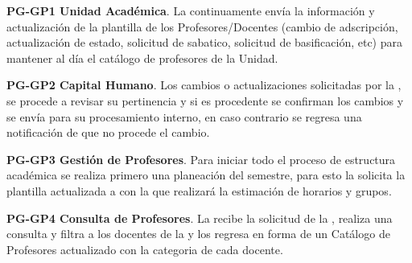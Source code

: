 
\begin{ADescripcion}
	\item \textbf{PG-GP1 Unidad Académica}. La  continuamente envía la información y actualización de la plantilla de los Profesores/Docentes (cambio de adscripción, actualización de estado, solicitud de sabatico, solicitud de basificación, etc) para mantener al día el catálogo de profesores de la Unidad.
	
	\item \textbf{PG-GP2 Capital Humano}. Los cambios o actualizaciones solicitadas por la , se procede a revisar su pertinencia y si es procedente se confirman los cambios y se envía para su procesamiento interno, en caso contrario se regresa una notificación de que no procede el cambio. 
	
	\item \textbf{PG-GP3 Gestión de Profesores}. Para iniciar todo el proceso de estructura académica se realiza primero una planeación del semestre, para esto la  solicita la plantilla actualizada a  con la que realizará la estimación de horarios y grupos. 
	
	\item \textbf{PG-GP4 Consulta de Profesores}. La  recibe la solicitud de la , realiza una consulta y filtra a los docentes de la  y los regresa en forma de un Catálogo de Profesores actualizado con la categoria de cada docente.  
	
	\end{ADescripcion}

